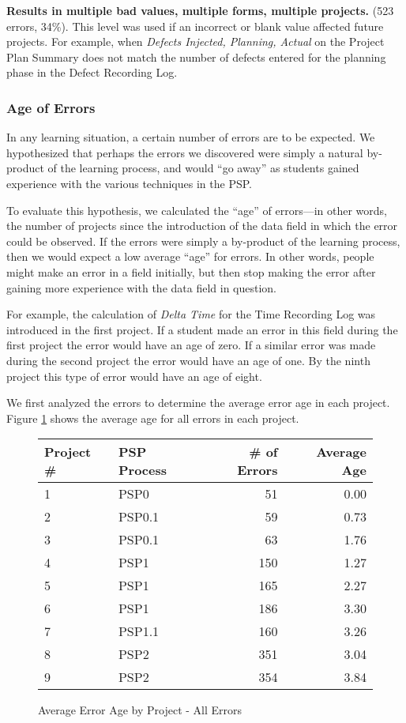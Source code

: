 {\bf Results in multiple bad values, multiple forms, multiple pro\-jects.}
(523 errors, 34\%).  This level was used if an incorrect or blank value
affected future projects.  For example, when {\it Defects Injected,
  Planning, Actual} on the Project Plan Summary does not match the number
of defects entered for the planning phase in the Defect Recording Log.

\subsubsection {Age of Errors}

In any learning situation, a certain number of errors are to be expected.
We hypothesized that perhaps the errors we discovered were simply a natural
by-product of the learning process, and would ``go away'' as students
gained experience with the various techniques in the PSP.

To evaluate this hypothesis, we calculated the ``age'' of errors---in other
words, the number of projects since the introduction of the data field in
which the error could be observed. If the errors were simply a by-product
of the learning process, then we would expect a low average ``age'' for
errors.  In other words, people might make an error in a field initially,
but then stop making the error after gaining more experience with the data
field in question.

For example, the calculation of {\it Delta Time} for the Time Recording Log
was introduced in the first project.  If a student made an error in this
field during the first project the error would have an age of zero.  If a
similar error was made during the second project the error would have an
age of one.  By the ninth project this type of error would have an age of
eight.
      
We first analyzed the errors to determine the average error age in each
project.  Figure \ref{errorAgeAll} shows the average age for all errors
in each project.

\begin{figure}[htbp]
  \begin{center} 
  \begin{tabular}{|l|l|r|r|}\hline 
  Project \# & PSP Process & \# of Errors & Average Age \\ \hline\hline 
  1 & PSP0    &  51  &  0.00 \\ \hline
  2 & PSP0.1  &  59  &  0.73 \\ \hline    
  3 & PSP0.1  &  63  &  1.76 \\ \hline
  4 & PSP1    & 150  &  1.27 \\ \hline
  5 & PSP1    & 165  &  2.27 \\ \hline
  6 & PSP1    & 186  &  3.30 \\ \hline
  7 & PSP1.1  & 160  &  3.26 \\ \hline
  8 & PSP2    & 351  &  3.04 \\ \hline
  9 & PSP2    & 354  &  3.84 \\ \hline
  \end{tabular}
  \end{center}
  \caption{\label{errorAgeAll}Average Error Age by Project - All Errors} 
  \end{figure}
      
